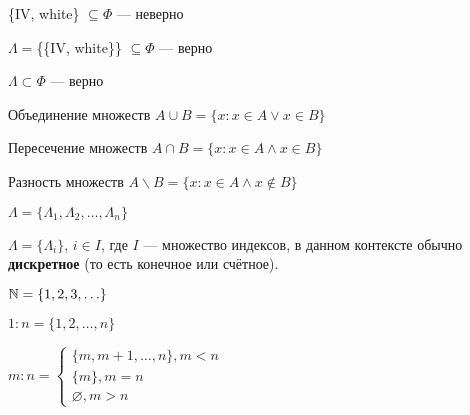 \begin{remark}
    \begin{compactitem}
        \item \{IV, white\} $\subseteq \Phi$ --- неверно
        \item $\Lambda=$\{\{IV, white\}\} $\subseteq \Phi$ --- верно
        \item $\Lambda \subset \Phi$ --- верно
    \end{compactitem}
\end{remark}

\begin{definition}
    \begin{compactitem}
        \item[Объединение множеств] $A \cup B = \{x: x \in A \lor x \in B\}$
        \item[Пересечение множеств] $A \cap B = \{x: x \in A \land x \in B\}$
        \item[Разность множеств] $A \backslash B = \{x: x\in A \land x \notin B\}$
    \end{compactitem}
\end{definition}

\begin{designation}
    \begin{compactitem}
        \item $\Lambda=\{\Lambda_1, \Lambda_2, \ldots, \Lambda_n\}$
        \item $\Lambda=\{\Lambda_i\}$, $i \in I$, где $I$ — множество индексов, в данном контексте обычно \textbf{дискретное} (то есть конечное или счётное).
    \end{compactitem}
\end{designation}

\begin{sh-definition}
    $\N = \{1, 2, 3, \ldots\}$
\end{sh-definition}

\begin{designation}
    \begin{compactitem}
        \item $1:n=\{1, 2, \ldots, n\}$
        \item $m:n=
        \begin{cases}
            \{m, m + 1, \ldots, n\}, m < n\\
            \{m\}, m = n\\
            \varnothing, m > n
        \end{cases}$
    \end{compactitem}
\end{designation}

